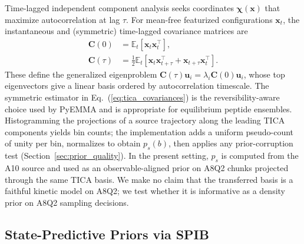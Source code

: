 \documentclass[journal=jctcce,manuscript=article,layout=twocolumn]{achemso}
\begin{document}
Time-lagged independent component analysis seeks coordinates $\boldsymbol\chi(\mathbf{x})$ that maximize autocorrelation at lag $\tau$.\cite{perezhernandez2013tica,schwantes2013improvements} For mean-free featurized configurations $\mathbf{x}_t$, the instantaneous and (symmetric) time-lagged covariance matrices are
\begin{equation}
\begin{split}
    \mathbf{C}(0) &= \mathbb{E}_t\!\left[\mathbf{x}_t \mathbf{x}_t^{\top}\right],\\
    \mathbf{C}(\tau) &= \tfrac{1}{2}\mathbb{E}_t\!\left[\mathbf{x}_t \mathbf{x}_{t+\tau}^{\top} + \mathbf{x}_{t+\tau} \mathbf{x}_t^{\top}\right].
\end{split}
    \label{eq:tica_covariances}
\end{equation}
These define the generalized eigenproblem $\mathbf{C}(\tau)\mathbf{u}_i = \lambda_i \mathbf{C}(0)\mathbf{u}_i$, whose top eigenvectors give a linear basis ordered by autocorrelation timescale. The symmetric estimator in Eq.~(\ref{eq:tica_covariances}) is the reversibility-aware choice used by PyEMMA\cite{scherer2015pyemma} and is appropriate for equilibrium peptide ensembles. Histogramming the projections of a source trajectory along the leading TICA components yields bin counts; the implementation adds a uniform pseudo-count of unity per bin, normalizes to obtain $p_s(b)$, then applies any prior-corruption test (Section~\ref{sec:prior_quality}). In the present setting, $p_s$ is computed from the A10 source and used as an observable-aligned prior on A8Q2 chunks projected through the same TICA basis. We make no claim that the transferred basis is a faithful kinetic model on A8Q2; we test whether it is informative as a density prior on A8Q2 sampling decisions.

\subsection{State-Predictive Priors via SPIB}
\end{document}
